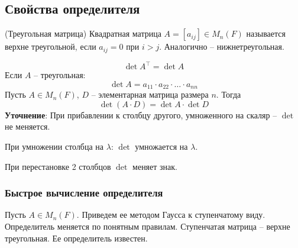 \begin{multicols}{2}
\subsection*{Свойства определителя}
\begin{definition}{(Треугольная матрица)}{}
    Квадратная матрица $A = [a_{ij}] \in M_{n}(F)$ называется верхне треугольной, если $a_{ij} = 0$ при $i>j$. Аналогично -- нижнетреугольная.
\end{definition}
        \useshortskip\[
        \det A^\intercal = \det A
        \]
        Если $A$ -- треугольная:\useshortskip
        \[ \det A = a_{11} \cdot a_{22} \cdot \ldots \cdot a_{nn}\] 
        Пусть $A \in M_{n}(F)$, $D$ -- элементарная матрица размера $n$. Тогда
        \[
            \det (A\cdot D) = \det A\cdot \det D
            \]   
\textbf{Уточнение}: При прибавлении к столбцу другого, умноженного на скаляр -- $\det$ не меняется.\par При умножении столбца на $\lambda$: $\det$ умножается на $\lambda$.\par При перестановке 2 столбцов $\det$ меняет знак.
\subsubsection*{Быстрое вычисление определителя}
Пусть $A \in M_n(F)$. Приведем ее методом Гаусса к ступенчатому виду. Определитель меняется по понятным правилам. Ступенчатая матрица -- верхне треугольная. Ее определитель известен.\vspace*{0.3cm}


\end{multicols}
